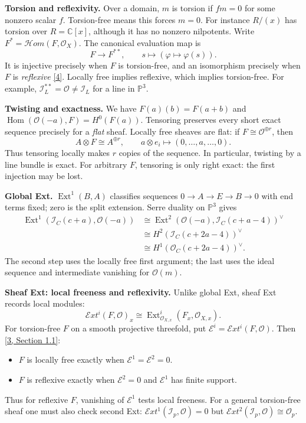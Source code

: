 \textbf{Torsion and reflexivity.}
Over a domain, $m$ is torsion if
$fm=0$ for some nonzero scalar $f$.
Torsion-free means this forces $m=0$.
For instance $R/(x)$ has torsion over
$R=\mathbb{C}[x]$, although it has no
nonzero nilpotents.
Write $F^*=\mathcal{H}om(F,\mathcal{O}_X)$.
The canonical evaluation map is
$$
F\longrightarrow F^{**},\qquad
s\longmapsto(\varphi\mapsto\varphi(s)).
$$
It is injective precisely when $F$ is
torsion-free, and an isomorphism
precisely when $F$ is \emph{reflexive}
\hyperref[item-jardim-stacks]{[4]}.
Locally free implies reflexive, which
implies torsion-free. For example,
$\mathcal{I}_L^{**}=\mathcal{O}\ne
\mathcal{I}_L$ for a line in
$\mathbb{P}^3$.

\textbf{Twisting and exactness.}
We have $F(a)(b)=F(a+b)$ and
$\operatorname{Hom}(\mathcal{O}(-a),F)
=H^0(F(a))$.
Tensoring preserves every short exact
sequence precisely for a \emph{flat}
sheaf. Locally free sheaves are flat:
if $F\cong\mathcal{O}^{\oplus r}$, then
$$
A\otimes F\cong A^{\oplus r},\qquad
a\otimes e_i\longmapsto
(0,\ldots,a,\ldots,0).
$$
Thus tensoring locally makes $r$ copies
of the sequence. In particular, twisting
by a line bundle is exact.
For arbitrary $F$, tensoring is only
right exact: the first injection may
be lost.

\textbf{Global Ext.}
$\operatorname{Ext}^1(B,A)$ classifies
sequences $0\to A\to E\to B\to0$
with end terms fixed; zero is the split
extension. Serre duality on
$\mathbb{P}^3$ gives
$$
\begin{aligned}
\operatorname{Ext}^1
(\mathcal{I}_C(c+a),\mathcal{O}(-a))
&\cong\operatorname{Ext}^2
(\mathcal{O}(-a),\mathcal{I}_C(c+a-4))^\vee\\
&\cong H^2(\mathcal{I}_C(c+2a-4))^\vee\\
&\cong H^1(\mathcal{O}_C(c+2a-4))^\vee.
\end{aligned}
$$
The second step uses the locally free
first argument; the last uses the ideal
sequence and intermediate vanishing
for $\mathcal{O}(m)$.

\textbf{Sheaf Ext: local freeness and
reflexivity.}
Unlike global Ext, sheaf Ext records
local modules:
$$
\mathcal{E}xt^i(F,\mathcal{O})_x
\cong\operatorname{Ext}^i_{\mathcal{O}_{X,x}}
(F_x,\mathcal{O}_{X,x}).
$$
For torsion-free $F$ on a smooth
projective threefold, put
$\mathcal{E}^i=\mathcal{E}xt^i
(F,\mathcal{O})$.
Then \hyperref[item-jardim-hl]
{[3, Section 1.1]}:
\begin{itemize}
\item $F$ is locally free exactly when
$\mathcal{E}^1=\mathcal{E}^2=0$.
\item $F$ is reflexive exactly when
$\mathcal{E}^2=0$ and $\mathcal{E}^1$
has finite support.
\end{itemize}
Thus for reflexive $F$, vanishing of
$\mathcal{E}^1$ tests local freeness.
For a general torsion-free sheaf one
must also check second Ext:
$\mathcal{E}xt^1
(\mathcal{I}_p,\mathcal{O})=0$
but
$\mathcal{E}xt^2(\mathcal{I}_p,\mathcal{O})
\cong\mathcal{O}_p$.

